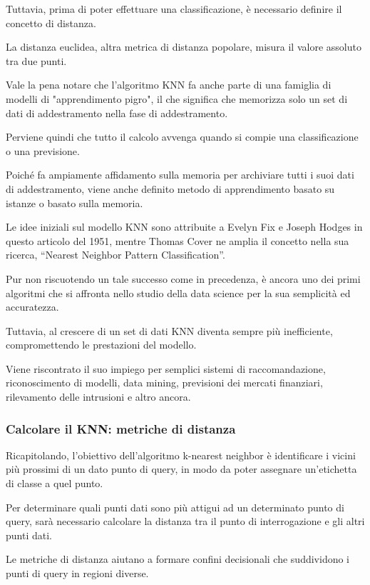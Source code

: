 Tuttavia, prima di poter effettuare una classificazione, è necessario definire il concetto di distanza. 

La distanza euclidea, altra metrica di distanza popolare, misura il valore assoluto tra due punti.

Vale la pena notare che l'algoritmo KNN fa anche parte di una famiglia di modelli di "apprendimento pigro", il che significa che memorizza solo un set di dati di addestramento nella fase di addestramento. 

Perviene quindi che tutto il calcolo avvenga quando si compie una classificazione o una previsione. 

Poiché fa ampiamente affidamento sulla memoria per archiviare tutti i suoi dati di addestramento, viene anche definito metodo di apprendimento basato su istanze o basato sulla memoria.

Le idee iniziali sul modello KNN sono attribuite a Evelyn Fix e Joseph Hodges in questo articolo \cite{KNNEvelynFixJosephHodges} del 1951, mentre Thomas Cover ne amplia il concetto nella sua ricerca, “Nearest Neighbor Pattern Classification”\cite{NearNeighPattClass}.

Pur non riscuotendo un tale successo come in precedenza, è ancora uno dei primi algoritmi che si affronta nello studio della data science per la sua semplicità ed accuratezza. 

Tuttavia, al crescere di un set di dati KNN diventa sempre più inefficiente, compromettendo le prestazioni del modello. 

Viene riscontrato il suo impiego per semplici sistemi di raccomandazione, riconoscimento di modelli, data mining, previsioni dei mercati finanziari, rilevamento delle intrusioni e altro ancora. 

\subsubsection{Calcolare il KNN: metriche di distanza}
Ricapitolando, l'obiettivo dell'algoritmo k-nearest neighbor è identificare i vicini più prossimi di un dato punto di query, in modo da poter assegnare un'etichetta di classe a quel punto. 

Per determinare quali punti dati sono più attigui ad un determinato punto di query, sarà necessario calcolare la distanza tra il punto di interrogazione e gli altri punti dati. 

Le metriche di distanza aiutano a formare confini decisionali che suddividono i punti di query in regioni diverse. 

